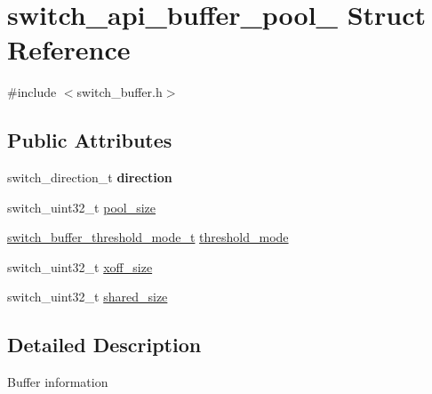 \hypertarget{structswitch__api__buffer__pool__}{\section{switch\+\_\+api\+\_\+buffer\+\_\+pool\+\_\+ Struct Reference}
\label{structswitch__api__buffer__pool__}
}


{\ttfamily \#include $<$switch\+\_\+buffer.\+h$>$}

\subsection*{Public Attributes}
\begin{DoxyCompactItemize}
\item 
\hypertarget{structswitch__api__buffer__pool___af373412e77fbb3874fefdc3a1b2bd7f3}{switch\+\_\+direction\+\_\+t {\bfseries direction}}\label{structswitch__api__buffer__pool___af373412e77fbb3874fefdc3a1b2bd7f3}

\item 
switch\+\_\+uint32\+\_\+t \hyperlink{structswitch__api__buffer__pool___ae06e61aaeb2d5f1c05fb0acc64a27f4f}{pool\+\_\+size}
\item 
\hyperlink{group__Buffer_gad5d808c4c42a170d1afae11767fddeff}{switch\+\_\+buffer\+\_\+threshold\+\_\+mode\+\_\+t} \hyperlink{structswitch__api__buffer__pool___ab4c0e9477a2c07acbfad5a134020dce7}{threshold\+\_\+mode}
\item 
switch\+\_\+uint32\+\_\+t \hyperlink{structswitch__api__buffer__pool___a392fac4a31d36b146f407f7174122c3a}{xoff\+\_\+size}
\item 
switch\+\_\+uint32\+\_\+t \hyperlink{structswitch__api__buffer__pool___a9924befb05683e0ca6252a1c697ccdc5}{shared\+\_\+size}
\end{DoxyCompactItemize}


\subsection{Detailed Description}
Buffer information 

